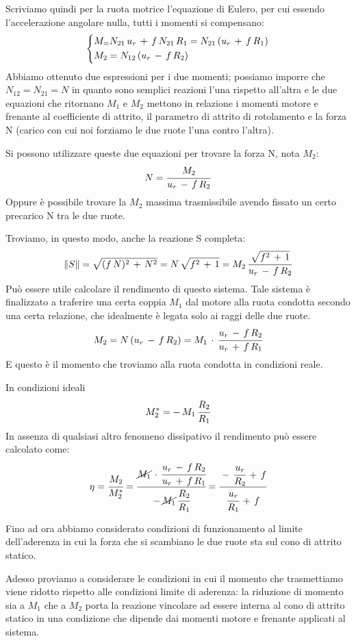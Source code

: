 Scriviamo quindi per la ruota motrice l'equazione di Eulero, per cui essendo l'accelerazione angolare nulla, tutti i momenti si compensano:
\[
\begin{dcases}
M_ = N_{21}\,u_r\,+\,f\,N_{21}\,R_1 = N_{21}\,(u_r\,+\,f\,R_1)\\
M_2=N_{12}\,(u_r\,-\,f\,R_2)
\end{dcases}
\]
Abbiamo ottenuto due espressioni per i due momenti; possiamo imporre che $N_{12} = N_{21} = N$ in quanto sono semplici reazioni l'una rispetto all'altra e le due equazioni che ritornano $M_1$ e $M_2$ mettono in relazione i momenti motore e frenante al coefficiente di attrito, il parametro di attrito di rotolamento e la forza N (carico con cui noi forziamo le due ruote l'una contro l'altra).

Si possono utilizzare queste due equazioni per trovare la forza N, nota $M_2$:
\[N = \cfrac{M_2}{u_r\,-\,f\,R_2}\] 
Oppure è possibile trovare la $M_2$ massima trasmissibile avendo fissato un certo precarico N tra le due ruote.

Troviamo, in questo modo, anche la reazione S completa:
\[\lVert S\rVert = \sqrt{(f\,N)^2\,+\,N^2} = N\,\sqrt{f^2\,+\,1}=M_2\,\cfrac{\sqrt{f^2\,+\,1}}{u_r\,-\,f\,R_2}\]
Può essere utile calcolare il rendimento di questo sistema. Tale sistema è finalizzato a traferire una certa coppia $M_1$ dal motore alla ruota condotta secondo una certa relazione, che idealmente è legata solo ai raggi delle due ruote.
\[M_2 = N\,(u_r\,-\,f\,R_2) = M_1\,\cdot\,\cfrac{u_r\,-\,f\,R_2}{u_r\,+\,f\,R_1}\]
E questo è il momento che troviamo alla ruota condotta in condizioni reale.

In condizioni ideali
\[M^*_2 = -\,M_1\,\cfrac{R_2}{R_1}\]
In assenza di qualsiasi altro fenomeno dissipativo il rendimento può essere calcolato come:
\[\eta = \cfrac{M_2}{M_2^*}=\cfrac{ \cancel{M_1}\,\cdot\,\cfrac{u_r\,-\,f\,R_2}{u_r\,+\,f\,R_1}}{ -\,\cancel{M_1}\,\cfrac{R_2}{R_1}} = \cfrac{-\,\cfrac{u_r}{R_2}\,+\,f}{\cfrac{u_r}{R_1}\,+\,f}\]

Fino ad ora abbiamo considerato condizioni di funzionamento al limite dell'aderenza in cui la forza che si scambiano le due ruote sta sul cono di attrito statico.

Adesso proviamo a considerare le condizioni in cui il momento che trasmettiamo viene ridotto rispetto alle condizioni limite di aderenza: la riduzione di momento sia a $M_1$ che a $M_2$ porta la reazione vincolare ad essere interna al cono di attrito statico in una condizione che dipende dai momenti motore e frenante applicati al sistema.

